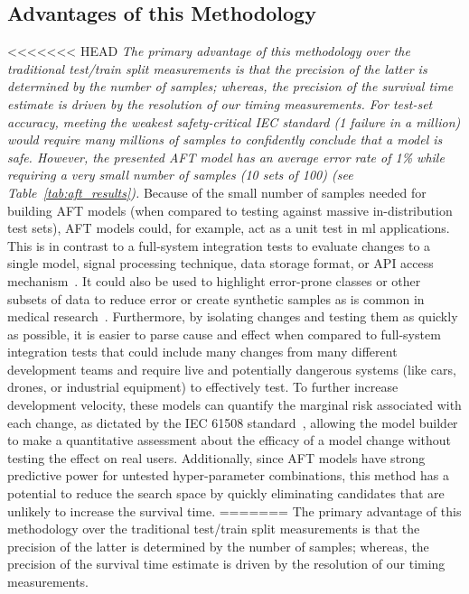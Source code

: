 \documentclass[sn-mathphys-num]{sn-jnl}%
\newcommand{\cm}[1]{\textit{{\color{blue}#1}}}
\begin{document}
\subsection{Advantages of this Methodology}
\label{advantages}
<<<<<<< HEAD
\cm{The primary advantage of this methodology over the traditional test/train split measurements is that the precision of the latter is determined by the number of samples; whereas, the precision of the survival time estimate is driven by the resolution of our timing measurements. For test-set accuracy,  meeting the weakest safety-critical IEC standard (1 failure in a million) would require many millions of samples to confidently conclude that a model is safe. However, the presented AFT model has an average error rate of 1\% while requiring a very small number of samples (10 sets of 100) (see Table~\ref{tab:aft_results}).}
Because of the small number of samples needed for building AFT models (when compared to testing against massive in-distribution test sets), AFT models could, for example, act as a unit test in \acrshort{ml} applications.
This is in contrast to a full-system integration tests to evaluate changes to a single model, signal processing technique, data storage format, or API access mechanism~\cite{schmoor2000sample,lachin1981introduction}. It could also be used to highlight error-prone classes or other subsets of data to reduce error or create synthetic samples as is common in medical research~\cite{kleinbaum1996survival}. Furthermore, by isolating changes and testing them as quickly as possible, it is easier to parse cause and effect when compared to full-system integration tests that could include many changes from many different development teams and require live and potentially dangerous systems (like cars, drones, or industrial equipment) to effectively test. To further increase development velocity, these models can quantify the marginal risk associated with each change, as dictated by the IEC 61508 standard~\cite{IEC61508}, allowing the model builder to make a quantitative assessment about the efficacy of a model change without testing the effect on real users. Additionally, since AFT models have strong predictive power for untested hyper-parameter combinations, this method has a potential to reduce the search space by quickly eliminating candidates that are unlikely to increase the survival time.
=======
The primary advantage of this methodology over the traditional test/train split measurements is that the precision of the latter is determined by the number of samples; whereas, the precision of the survival time estimate is driven by the resolution of our timing measurements. 
\end{document}
